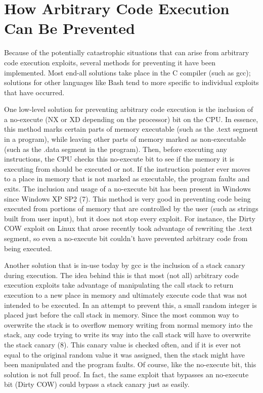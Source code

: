 \section{How Arbitrary Code Execution Can Be Prevented}

Because of the potentially catastrophic situations that can arise from arbitrary code execution exploits, several methods for preventing it have been implemented. Most end-all solutions take place in the C compiler (such as gcc); solutions for other languages like Bash tend to more specific to individual exploits that have occurred.

One low-level solution for preventing arbitrary code execution is the inclusion of a no-execute (NX or XD depending on the processor) bit on the CPU. In essence, this method marks certain parts of memory executable (such as the .text segment in a program), while leaving other parts of memory marked as non-executable (such as the .data segment in the program). Then, before executing any instructions, the CPU checks this no-execute bit to see if the memory it is executing from should be executed or not. If the instruction pointer ever moves to a place in memory that is not marked as executable, the program faults and exits. The inclusion and usage of a no-execute bit has been present in Windows since Windows XP SP2 (7). This method is very good in preventing code being executed from portions of memory that are controlled by the user (such as strings built from user input), but it does not stop every exploit. For instance, the Dirty COW exploit on Linux that arose recently took advantage of rewriting the .text segment, so even a no-execute bit couldn’t have prevented arbitrary code from being executed.

Another solution that is in-use today by gcc is the inclusion of a stack canary during execution. The idea behind this is that most (not all) arbitrary code execution exploits take advantage of manipulating the call stack to return execution to a new place in memory and ultimately execute code that was not intended to be executed. In an attempt to prevent this, a small random integer is placed just before the call stack in memory. Since the most common way to overwrite the stack is to overflow memory writing from normal memory into the stack, any code trying to write its way into the call stack will have to overwrite the stack canary (8). This canary value is checked often, and if it is ever not equal to the original random value it was assigned, then the stack might have been manipulated and the program faults. Of course, like the no-execute bit, this solution is not full proof. In fact, the same exploit that bypasses an no-execute bit (Dirty COW) could bypass a stack canary just as easily.


